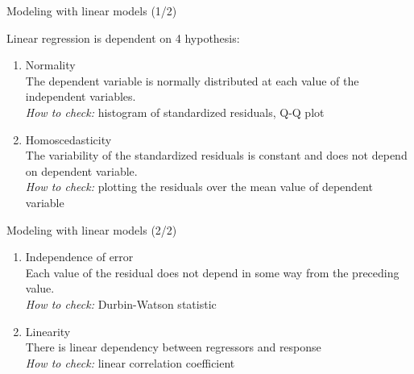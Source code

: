 \documentclass{beamer}
\begin{document}
\begin{frame}
{\centerline{Modeling with linear models (1/2)}}
Linear regression is dependent on 4 hypothesis:
\begin{enumerate}
\item Normality\\
The dependent variable is normally distributed at each value of the independent variables. \\
\textit{How to check:} histogram of standardized residuals, Q-Q plot
\item Homoscedasticity\\
The variability of the standardized residuals is constant and does not depend on dependent variable.\\
\textit{How to check:} plotting the residuals over the mean value of dependent variable
\end{enumerate}

\end{frame}
\begin{frame}
{\centerline{Modeling with linear models (2/2)}}
\begin{enumerate}
\item Independence of error\\
Each value of the residual does not depend in some way from the preceding value.\\
\textit{How to check:} Durbin-Watson statistic
\item Linearity\\
There is linear dependency between regressors and response\\
\textit{How to check:} linear correlation coefficient
\end{enumerate}

\end{frame}
\end{document}
